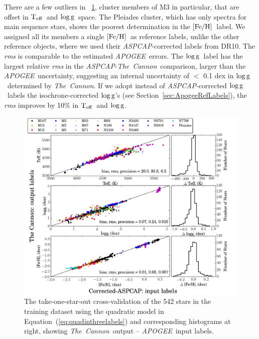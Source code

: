 \documentclass[12pt, preprint]{aastex}
\newcommand{\sectionname}{Section}
\newcommand{\tc}{\textsl{The~Cannon}}
\newcommand{\apogee}{\textsl{APOGEE}}
\newcommand{\aspcap}{\textsl{ASPCAP}}
\newcommand{\teff}{\mbox{$\rm T_{eff}$}}
\newcommand{\feh}{\mbox{$\rm [Fe/H]$}}
\newcommand{\logg}{\mbox{$\rm \log g$}}
\begin{document}
There are a few outliers in \figurename~\ref{fig:takeonestarout}, cluster members of M3 in particular, that are offset in \teff\ and \logg\ space. 
The Pleiades cluster, which has only spectra for main sequence stars, shows the poorest determination in the \feh\ label. We assigned all its members a single \feh ~as reference labels, unlike the other reference objects, where we used their \aspcap -corrected labels from DR10.
The \textit{rms} is comparable to the estimated \apogee\ errors. The \logg\ label has the largest relative \textit{rms} in the \aspcap\--\tc\ comparison, larger than the \apogee\ uncertainty, suggesting an internal uncertainty of $<$ 0.1 dex in \logg\ determined by \tc.
If we adopt instead of \aspcap -corrected \logg\ labels the isochrone-corrected \logg 's (see \sectionname~\ref{sec:ApogeeRefLabels}), the \textit{rms} improves by 10\% in \teff\ and \logg.

\begin{figure}[h!]
\centering
    \includegraphics[scale=0.45]{./plots/aftersubmit/fig4.png}
\caption{The take-one-star-out cross-validation of the 542 stars in the training dataset using the quadratic model in Equation~(\ref{eq:quadinthreelabels}) and corresponding histograms at right, showing \tc\ output -- \apogee\ input labels.}
\label{fig:takeonestarout}
\end{figure}
\end{document}
